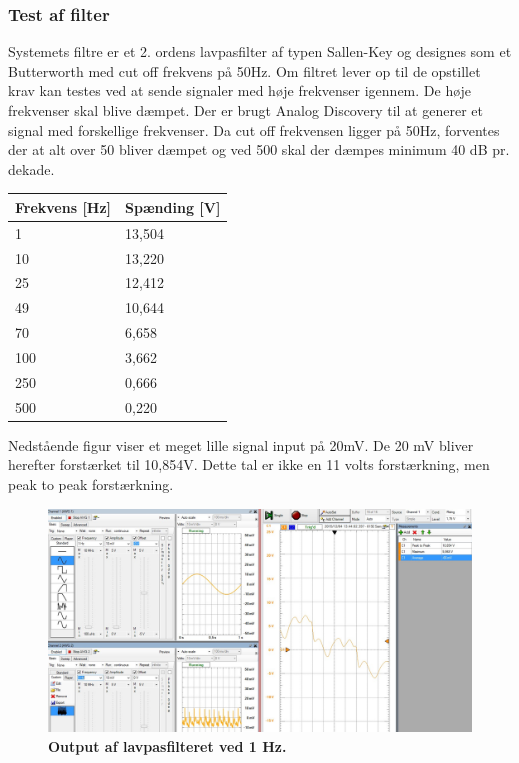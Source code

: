 \subsubsection{Test af filter}
Systemets filtre er et 2. ordens lavpasfilter af typen Sallen-Key og designes som et Butterworth med cut off frekvens på 50Hz. Om filtret lever op til de opstillet krav kan testes ved at sende signaler med høje frekvenser igennem. De høje frekvenser skal blive dæmpet. Der er brugt Analog Discovery til at generer et signal med forskellige frekvenser. Da cut off frekvensen ligger på 50Hz, forventes der at alt over 50 bliver dæmpet og ved 500 skal der dæmpes minimum 40 dB pr. dekade.
\begin{table}[H]
\label{tab:tabel2}
\begin{tabular}{| l | l |}
   \hline
   Frekvens [Hz] & Spænding [V] \\ \hline
   1 & 13,504 \\ \hline
   10 & 13,220\\ \hline
   25 & 12,412 \\ \hline
   49 & 10,644 \\\hline
   70 & 6,658 \\\hline
   100 & 3,662 \\\hline
   250 & 0,666 \\\hline
   500 & 0,220\\\hline
\end{tabular}
\end{table}
Nedstående figur viser et meget lille signal input på 20mV. De 20 mV bliver herefter forstærket til 10,854V. Dette tal er ikke en 11 volts forstærkning, men peak to peak forstærkning. 
\begin{figure}[H]
\includegraphics[width =1.0\textwidth , center]{billeder/testFilter}
\caption{\textbf{Output af lavpasfilteret ved 1 Hz.}}
\end{figure}
